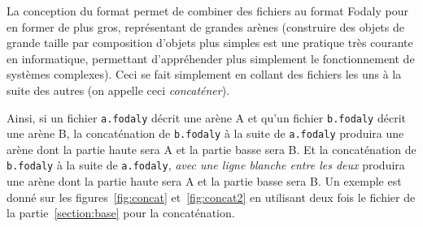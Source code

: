 \documentclass[a4paper]{paper}
\newcommand{\nomFormat}{Fodaly}
\begin{document}
La conception du format permet de combiner des fichiers au format \nomFormat{} pour en former de plus gros, représentant de grandes arènes (construire des objets de grande taille par composition d'objets plus simples est une pratique très courante en informatique, permettant d'appréhender plus simplement le fonctionnement de systèmes complexes). Ceci se fait simplement en collant des fichiers les uns à la suite des autres (on appelle ceci \emph{concaténer}).

Ainsi, si un fichier \verb|a.fodaly| décrit une arène A et qu'un fichier \verb|b.fodaly| décrit une arène B, la concaténation de \verb|b.fodaly| à la suite de \verb|a.fodaly| produira une arène dont la partie haute sera A et la partie basse sera B.
Et la concaténation de \verb|b.fodaly| à la suite de \verb|a.fodaly|, \emph{avec une ligne blanche entre les deux} produira une arène dont la partie haute sera A et la partie basse sera B.
Un exemple est donné sur les figures~\ref{fig:concat} et~\ref{fig:concat2} en utilisant deux fois le fichier de la partie~\ref{section:base} pour la concaténation.
\end{document}
